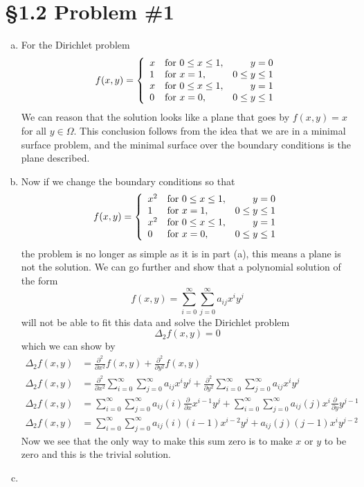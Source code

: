 \documentclass[11pt]{article}
\numberwithin{equation}{section}
\begin{document}
\section{\S 1.2 Problem \#1}
\begin{enumerate}[(a)]
\item
For the  Dirichlet problem
$$f(x,y) = \left\{\begin{array}{llr}
		x 	&\textnormal{for}\ 0\le x\le1, &y=0\\
		1 	&\textnormal{for}\ x=1, &0\le y\le1\\
		x 	&\textnormal{for}\ 0\le x\le1, &y=1\\
		0 	&\textnormal{for}\ x=0, &0\le y\le1
		\end{array}\right. $$
We can reason that the solution looks like a plane that goes by $f(x,y)=x$ for all $y\in\Omega$. This conclusion follows from the idea that we are in a minimal surface problem, and the minimal surface over the boundary conditions is the plane described.

\item
Now if we change the boundary conditions so that
$$f(x,y) = \left\{\begin{array}{llr}
		x^2 	&\textnormal{for}\ 0\le x\le1, &y=0\\
		1 	&\textnormal{for}\ x=1, &0\le y\le1\\
		x^2 	&\textnormal{for}\ 0\le x\le1, &y=1\\
		0 	&\textnormal{for}\ x=0, &0\le y\le1
		\end{array}\right. $$
the problem is no longer as simple as it is in part (a), this means a plane is not the solution. We can go further and show that a polynomial solution of the form
$$f(x,y) = \sum_{i=0}^{\infty}\sum_{j=0}^{\infty} a_{ij}x^iy^j$$
will not be able to fit this data and solve the Dirichlet problem
$$\Delta_2 f(x,y) = 0$$
which we can show by
\begin{align*}
\Delta_2 f(x,y) &=  \frac{\partial^2}{\partial x^2}f(x,y) + \frac{\partial^2}{\partial y^2}f(x,y)\\
\Delta_2 f(x,y) &=  \frac{\partial^2}{\partial x^2}\sum_{i=0}^{\infty}\sum_{j=0}^{\infty} a_{ij}x^iy^j + \frac{\partial^2}{\partial y^2}\sum_{i=0}^{\infty}\sum_{j=0}^{\infty} a_{ij}x^iy^j\\
\Delta_2 f(x,y) &=  \sum_{i=0}^{\infty}\sum_{j=0}^{\infty} a_{ij}(i)\frac{\partial}{\partial x}x^{i-1}y^j + \sum_{i=0}^{\infty}\sum_{j=0}^{\infty} a_{ij}(j)x^i\frac{\partial}{\partial y}y^{j-1}\\
\Delta_2 f(x,y) &=  \sum_{i=0}^{\infty}\sum_{j=0}^{\infty} a_{ij}(i)(i-1)x^{i-2}y^j +  a_{ij}(j)(j-1)x^iy^{j-2}
\end{align*}
Now we see that the only way to make this sum zero is to make $x$ or $y$ to be zero and this is the trivial solution.

\item
\end{enumerate}
\end{document}

